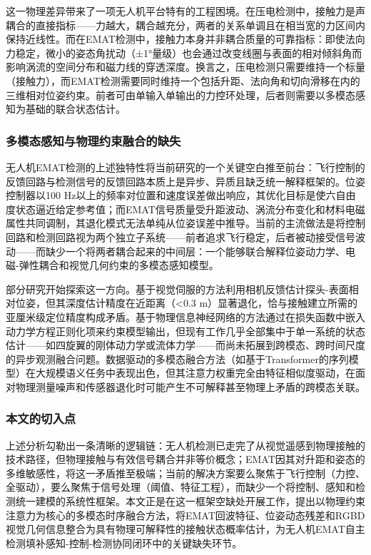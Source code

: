 这一物理差异带来了一项无人机平台特有的工程困境。在压电检测中，接触力是声耦合的直接指标——力越大，耦合越充分，两者的关系单调且在相当宽的力区间内保持近线性。而在EMAT检测中，接触力本身并非耦合质量的可靠指标：即使法向力稳定，微小的姿态角扰动（±1°量级）也会通过改变线圈与表面的相对倾斜角而影响涡流的空间分布和磁力线的穿透深度。换言之，压电检测只需要维持一个标量（接触力），而EMAT检测需要同时维持一个包括升距、法向角和切向滑移在内的三维相对位姿约束。前者可由单输入单输出的力控环处理，后者则需要以多模态感知为基础的联合状态估计。

\subsubsection{多模态感知与物理约束融合的缺失}

无人机EMAT检测的上述独特性将当前研究的一个关键空白推至前台：飞行控制的反馈回路与检测信号的反馈回路本质上是异步、异质且缺乏统一解释框架的。位姿控制器以100 Hz以上的频率对位置和速度误差做出响应，其优化目标是使六自由度状态逼近给定参考值；而EMAT信号质量受升距波动、涡流分布变化和材料电磁属性共同调制，其退化模式无法单纯从位姿误差中推导。当前的主流做法是将控制回路和检测回路视为两个独立子系统——前者追求飞行稳定，后者被动接受信号波动——而缺少一个将两者耦合起来的中间层：一个能够联合解释位姿动力学、电磁-弹性耦合和视觉几何约束的多模态感知模型。

部分研究开始探索这一方向。基于视觉伺服的方法利用相机反馈估计探头-表面相对位姿，但其深度估计精度在近距离（<0.3 m）显著退化，恰与接触建立所需的亚厘米级定位精度构成矛盾。基于物理信息神经网络的方法通过在损失函数中嵌入动力学方程正则化项来约束模型输出，但现有工作几乎全部集中于单一系统的状态估计——如四旋翼的刚体动力学或流体力学——而尚未拓展到跨模态、跨时间尺度的异步观测融合问题。数据驱动的多模态融合方法（如基于Transformer的序列模型）在大规模语义任务中表现出色，但其注意力权重完全由特征相似度驱动，在面对物理测量噪声和传感器退化时可能产生不可解释甚至物理上矛盾的跨模态关联。

\subsubsection{本文的切入点}

上述分析勾勒出一条清晰的逻辑链：无人机检测已走完了从视觉遥感到物理接触的技术路径，但物理接触与有效信号耦合并非等价概念；EMAT因其对升距和姿态的多维敏感性，将这一矛盾推至极端；当前的解决方案要么聚焦于飞行控制（力控、全驱动），要么聚焦于信号处理（阈值、特征工程），而缺少一个将控制、感知和检测统一建模的系统性框架。本文正是在这一框架空缺处开展工作，提出以物理约束注意力为核心的多模态时序融合方法，将EMAT回波特征、位姿动态残差和RGBD视觉几何信息整合为具有物理可解释性的接触状态概率估计，为无人机EMAT自主检测填补感知-控制-检测协同闭环中的关键缺失环节。

